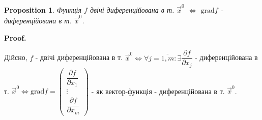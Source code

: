 \documentclass[a4paper, 10pt]{article}
\makeatletter
\def\departial#1#2{\dfrac{\partial {#1}}{\partial {#2}}}
\def\qed{$\blacksquare$}
\theoremstyle{theoremdd}
\theoremstyle{theoremdd}
\theoremstyle{theoremdd}
\theoremstyle{theoremdd}
\theoremstyle{theoremdd}
\newtheorem{proposition}[theorem]{Proposition}
\theoremstyle{theoremdd}
\theoremstyle{theoremdd}
\theoremstyle{theoremdd}
\renewenvironment{proof}[1][Proof.\\]{\par
\pushQED{\hfill \qed}%
\normalfont \topsep6\p@\@plus6\p@\relax
\trivlist
\item\relax
{\bfseries
#1\@addpunct{.}}\hspace\labelsep\ignorespaces
}{%
\popQED\endtrivlist\@endpefalse
}
\newcommand\Norm[1]{\lVert#1\rVert}
\makeatother
\begin{document}
\begin{proposition}
Функція $f$ двічі диференційована в т. $\vec{x}^0$ $\iff$ $\textrm{grad} f$ - диференційована в т. $\vec{x}^0$.

\end{proposition}

\begin{proof}
Дійсно, $f$ - двічі диференційована в т. $\vec{x}^0 \iff \forall j=\overline{1,m}: \exists \departial{f}{x_j}$ - диференційована в т. $\vec{x}^0 \iff \text{grad} f = \begin{pmatrix}
\departial{f}{x_1} \\ \vdots \\ \departial{f}{x_m}
\end{pmatrix}$ - як вектор-функція - диференційована в т. $\vec{x}^0$.
\end{proof}
\end{document}
